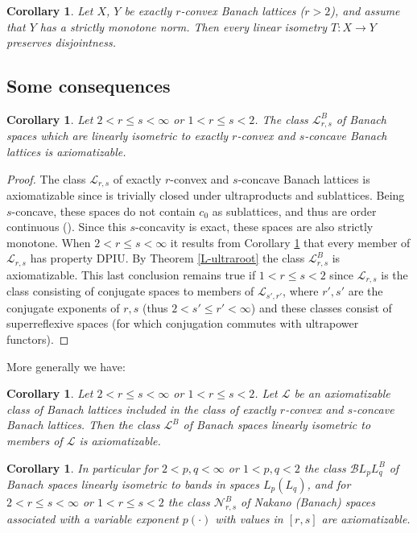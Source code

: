 \documentclass[11pt]{amsart}
\theoremstyle{plain}
\newtheorem{corollary}[theorem]{Corollary}
\theoremstyle{remark}
\begin{document}
\begin{corollary}\label{DPisometries} Let $X$,  $Y$ be  exactly $r$-convex Banach lattices ($r>2$), and assume that $Y$ has a  strictly monotone norm. Then every linear isometry $T: X\to Y$ preserves disjointness. 
\end{corollary}

\subsection{Some consequences}

\begin{corollary}\label{axiomatizability2} Let $2<r\le s<\infty$ or $1<r\le s<2$. The class $\mathcal L^B_{r,s}$ of Banach spaces which are linearly isometric to exactly $r$-convex and $s$-concave Banach lattices is axiomatizable.
\end{corollary}

\begin{proof} The class $\mathcal L_{r,s}$ of exactly $r$-convex and $s$-concave Banach lattices is axiomatizable since is trivially closed under ultraproducts and sublattices. Being $s$-concave, these spaces do not contain $c_0$ as sublattices, and thus are order continuous (\cite[Thm 1.c.4 and the Remark that follows]{LT}). Since this  $s$-concavity is exact, these spaces are also strictly monotone. When $2<r\le s<\infty$ it results from   Corollary \ref {DPisometries} that every member of $\mathcal L_{r,s}$ has property DPIU.  By Theorem \ref{L-ultraroot} the class $\mathcal L^B_{r,s}$  is axiomatizable. This last conclusion remains true if $1<r\le s<2$ since $\mathcal L_{r,s}$ is the class consisting of conjugate spaces to members of $\mathcal L_{s',r'}$, where $r',s'$ are the conjugate exponents of $r,s$ (thus $2<s'\le r'<\infty$) and these classes consist of superreflexive spaces (for which conjugation commutes with ultrapower functors).
\end{proof}

More generally we have:

\begin{corollary} Let $2<r\le s<\infty$ or $1<r\le s<2$. Let $\mathcal L$  be an axiomatizable class of Banach lattices included in the class of exactly $r$-convex and $s$-concave Banach lattices. Then the class $\mathcal L^B$ of Banach spaces linearly isometric to members of $\mathcal L$ is axiomatizable.
\end{corollary} 

\begin{corollary} In particular for $2<p,q<\infty$ or $1<p,q<2$ the class $\mathcal BL_pL_q^{B}$ of Banach spaces linearly isometric to bands in spaces $L_p(L_q)$,  and for $2<r\le s<\infty$ or $1<r\le s<2$  the class  $\mathcal N_{r,s}^B$ of Nakano (Banach) spaces associated with a variable exponent $p(\cdot)$ with values in $[r,s]$ are axiomatizable.
\end{corollary}
\end{document}
